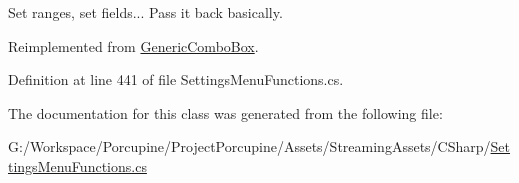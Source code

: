 Set ranges, set fields... Pass it back basically. 



Reimplemented from \hyperlink{class_generic_combo_box_ae1800a7c68d3af046a2b147e117437ff}{Generic\+Combo\+Box}.



Definition at line 441 of file Settings\+Menu\+Functions.\+cs.



The documentation for this class was generated from the following file\+:\begin{DoxyCompactItemize}
\item 
G\+:/\+Workspace/\+Porcupine/\+Project\+Porcupine/\+Assets/\+Streaming\+Assets/\+C\+Sharp/\hyperlink{_settings_menu_functions_8cs}{Settings\+Menu\+Functions.\+cs}\end{DoxyCompactItemize}
